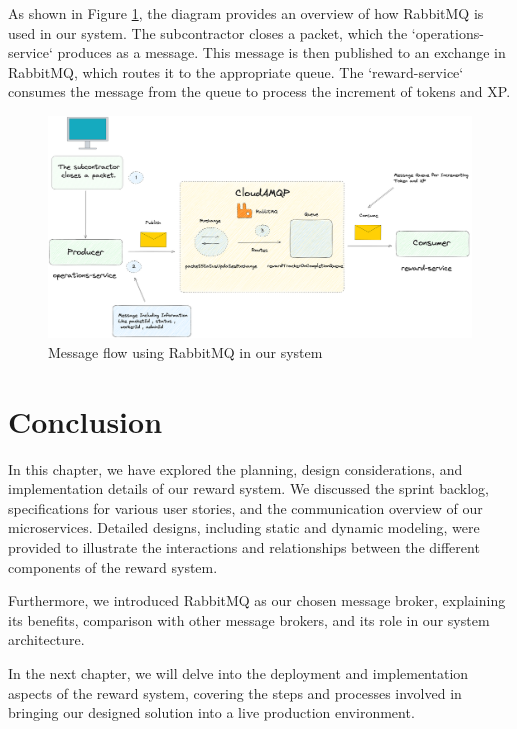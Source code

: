 As shown in Figure \ref{fig:rabbitmq-diagram}, the diagram provides an overview of how RabbitMQ is used in our system. The subcontractor closes a packet, which the `operations-service` produces as a message. This message is then published to an exchange in RabbitMQ, which routes it to the appropriate queue. The `reward-service` consumes the message from the queue to process the increment of tokens and XP.

\begin{figure}[H]
    \centering
    \includegraphics[width=\linewidth]{src/assets/diagrams/RabbitMqExplanation.png}
    \caption{Message flow using RabbitMQ in our system}
    \label{fig:rabbitmq-diagram}
\end{figure}

\setcounter{secnumdepth}{0}
\section{Conclusion}
In this chapter, we have explored the planning, design considerations, and implementation details of our reward system. We discussed the sprint backlog, specifications for various user stories, and the communication overview of our microservices. Detailed designs, including static and dynamic modeling, were provided to illustrate the interactions and relationships between the different components of the reward system. 

Furthermore, we introduced RabbitMQ as our chosen message broker, explaining its benefits, comparison with other message brokers, and its role in our system architecture.

In the next chapter, we will delve into the deployment and implementation aspects of the reward system, covering the steps and processes involved in bringing our designed solution into a live production environment.


 